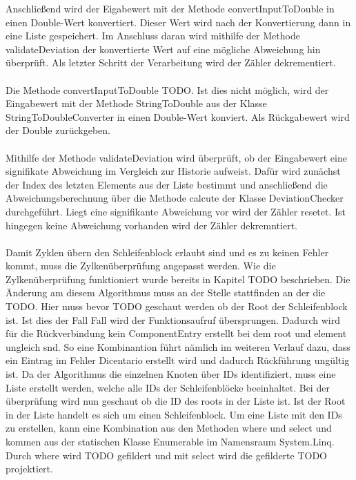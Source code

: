 \documentclass{article}
\begin{document}
    Anschließend wird der Eigabewert mit der Methode convertInputToDouble in einen Double-Wert konvertiert.
    Dieser Wert wird nach der Konvertierung dann in eine Liste gespeichert.
    Im Anschluss daran wird mithilfe der Methode validateDeviation der konvertierte Wert auf eine mögliche Abweichung hin überprüft.
    Als letzter Schritt der Verarbeitung wird der Zähler dekrementiert.\\
    \\
    Die Methode convertInputToDouble TODO. Ist dies nicht möglich, wird der Eingabewert mit der Methode StringToDouble aus der Klasse StringToDoubleConverter in einen Double-Wert konviert.
    Als Rückgabewert wird der Double zurückgeben.\\
    \\
    Mithilfe der Methode validateDeviation wird überprüft, ob der Eingabewert eine signifikate Abweichung im Vergleich zur Historie aufweist.
    Dafür wird zunächst der Index des letzten Elements aus der Liste bestimmt und anschließend die Abweichungsberechnung über die Methode calcute der Klasse DeviationChecker durchgeführt.
    Liegt eine signifikante Abweichung vor wird der Zähler resetet. Ist hingegen keine Abweichung vorhanden wird der Zähler dekremntiert.\\
    \\
    Damit Zyklen übern den Schleifenblock erlaubt sind und es zu keinen Fehler kommt, muss die Zylkenüberprüfung angepasst werden.
    Wie die Zylkenüberprüfung funktioniert wurde bereits in Kapitel TODO beschrieben.
    Die Änderung am diesem Algorithmus muss an der Stelle stattfinden an der die TODO.
    Hier muss bevor TODO geschaut werden ob der Root der Schleifenblock ist.
    Ist dies der Fall Fall wird der Funktionsaufruf übersprungen.
    Dadurch wird für die Rückverbindung kein ComponentEntry erstellt bei dem root und element ungleich snd. 
    So eine Kombinantion führt nämlich im weiteren Verlauf dazu, dass ein Eintrag im Fehler Dicentario erstellt wird und dadurch Rückführung ungültig ist.    
    Da der Algorithmus die einzelnen Knoten über IDs identifiziert, muss eine Liste erstellt werden, welche alle IDs der Schleifenblöcke beeinhaltet. 
    Bei der überprüfung wird nun geschaut ob die ID des roots in der Liste ist. 
    Ist der Root in der Liste handelt es sich um einen Schleifenblock. 
    Um eine Liste mit den IDs zu erstellen, kann eine Kombination aus den Methoden where und select und kommen aus der statischen Klasse Enumerable im Namensraum System.Linq. 
    Durch where wird TODO gefildert und mit select wird die gefilderte TODO projektiert.
\end{document}
